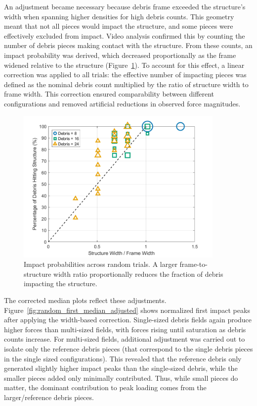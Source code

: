 \documentclass{article}
\begin{document}
An adjustment became necessary because debris frame exceeded the structure’s width when spanning higher densities for high debris counts. This geometry meant that not all pieces would impact the structure, and some pieces were effectively excluded from impact. Video analysis confirmed this by counting the number of debris pieces making contact with the structure. From these counts, an impact probability was derived, which decreased proportionally as the frame widened relative to the structure (Figure~\ref{fig:impact_probabilities}). To account for this effect, a linear correction was applied to all trials: the effective number of impacting pieces was defined as the nominal debris count multiplied by the ratio of structure width to frame width. This correction ensured comparability between different configurations and removed artificial reductions in observed force magnitudes.

\begin{figure}[htbp]
    \centering
    \includegraphics[width=0.9\textwidth]{Impact_probabilities.png}
    \caption{Impact probabilities across random trials. A larger frame-to-structure width ratio proportionally reduces the fraction of debris impacting the structure.}
    \label{fig:impact_probabilities}
\end{figure}

The corrected median plots reflect these adjustments. Figure~\ref{fig:random_first_median_adjusted} shows normalized first impact peaks after applying the width-based correction. Single-sized debris fields again produce higher forces than multi-sized fields, with forces rising until saturation as debris counts increase. For multi-sized fields, additional adjustment was carried out to isolate only the reference debris pieces (that correspond to the single debris pieces in the single sized configurations). This revealed that the reference  debris only generated slightly higher impact peaks than the single-sized debris, while the smaller pieces added only minimally contributed. Thus, while small pieces do matter, the dominant contribution to peak loading comes from the larger/reference debris pieces.
\end{document}

